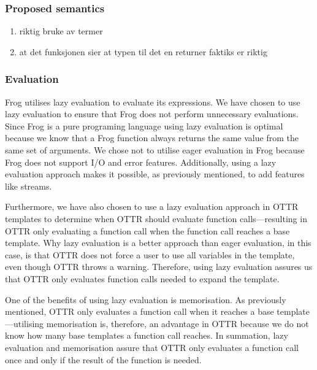 \subsubsection{Proposed semantics}
\begin{enumerate}
    \item riktig bruke av termer 
    \item at det funksjonen sier at typen til det en returner faktiks er riktig
\end{enumerate}

\subsubsection{Evaluation}
Frog utilises lazy evaluation to evaluate its expressions. We have chosen to use lazy evaluation to ensure that Frog does not perform unnecessary evaluations. Since Frog is a pure programing language using lazy evaluation is optimal because we know that a Frog function always returns the same value from the same set of arguments. We chose not to utilise eager evaluation in Frog because Frog does not support I/O and error features. Additionally, using a lazy evaluation approach makes it possible, as previously mentioned, to add features like streams.

\para
Furthermore, we have also chosen to use a lazy evaluation approach in OTTR templates to determine when OTTR should evaluate function calls—resulting in OTTR only evaluating a function call when the function call reaches a base template. Why lazy evaluation is a better approach than eager evaluation, in this case, is that OTTR does not force a user to use all variables in the template, even though OTTR throws a warning. Therefore, using lazy evaluation assures us that OTTR only evaluates function calls needed to expand the template.  

\para
One of the benefits of using lazy evaluation is memorisation. As previously mentioned, OTTR only evaluates a function call when it reaches a base template—utilising memorisation is, therefore, an advantage in OTTR because we do not know how many base templates a function call reaches. In summation, lazy evaluation and memorisation assure that OTTR only evaluates a function call once and only if the result of the function is needed.

